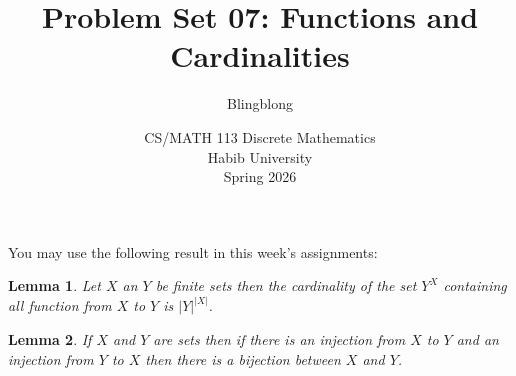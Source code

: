 \documentclass[a4paper]{exam}
\title{Problem Set 07: Functions and Cardinalities}
\author{Blingblong} %
\date{CS/MATH 113 Discrete Mathematics\\Habib University\\Spring 2026}
\newtheorem{lemma}{Lemma}
\begin{document}
\maketitle      

You may use the following result in this week's assignments:

\begin{lemma}\label{lemma:1}
    Let $X$ an $Y$ be finite sets then the cardinality of the set $Y^X$ containing all function from $X$ to $Y$ is $|Y|^{|X|}$.
\end{lemma}
\begin{lemma}\label{lemma:2}
    If $X$ and $Y$ are sets then if there is an injection from $X$ to $Y$ and an injection from $Y$ to $X$ then there is a bijection between $X$ and $Y$.
\end{lemma}
\end{document}
